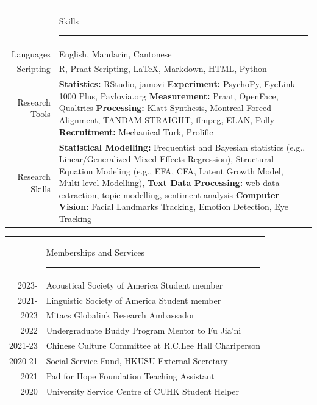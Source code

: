 \documentclass[letterpaper, 11pt]{article}
\newcommand{\headingfont}{\Large\color{black}}
\newenvironment{SectionTableSingleSpace}[1]{
	\renewcommand*{\arraystretch}{1.3}
	\setlength{\tabcolsep}{10pt}
	\begin{longtable}{Rp{6.3in}} & #1 \vspace{0.13cm}\hrule \\[0.6em] }
{\end{longtable}\vspace{-.3cm}}
\begin{document}
\newpage
\begin{SectionTableSingleSpace}{\headingfont Skills}
Languages &
English, Mandarin, Cantonese\\

Scripting &
R, Praat Scripting, \LaTeX, Markdown, HTML, Python\\

Research Tools &
\textbf{Statistics:} RStudio, jamovi\newline
\textbf{Experiment:} PsychoPy, EyeLink 1000 Plus, Pavlovia.org\newline
\textbf{Measurement:} Praat, OpenFace, Qualtrics\newline
\textbf{Processing:} Klatt Synthesis, Montreal Forced Alignment, TANDAM-STRAIGHT, ffmpeg, ELAN, Polly\newline
\textbf{Recruitment:} Mechanical Turk, Prolific\\

Research Skills &
\textbf{Statistical Modelling:}{ Frequentist and Bayesian statistics (e.g., Linear/Generalized Mixed Effects Regression)}, Structural Equation Modeling (e.g., EFA, CFA, Latent Growth Model, Multi-level Modelling), \newline
\textbf{Text Data Processing:} web data extraction, topic modelling, sentiment analysis\newline
\textbf{Computer Vision:} Facial Landmarks Tracking, Emotion Detection, Eye Tracking\\
\end{SectionTableSingleSpace}


\begin{SectionTableSingleSpace}{\headingfont Memberships and Services}
2023-&
Acoustical Society of America \hfill Student member\\
2021-&
Linguistic Society of America \hfill Student member\\

2023 &
Mitacs \hfill Globalink Research Ambassador \\
2022&
 Undergraduate Buddy Program \hfill Mentor to Fu Jia'ni \\
2021-23&
Chinese Culture Committee at R.C.Lee Hall \hfill Chariperson\\
2020-21&
Social Service Fund, HKUSU \hfill External Secretary\\
2021&
Pad for Hope Foundation \hfill Teaching Assistant\\
2020&
University Service Centre of CUHK \hfill Student Helper\\
\end{SectionTableSingleSpace}
\end{document}
